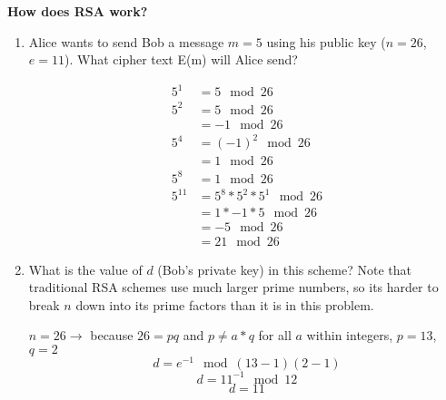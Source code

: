 \question \textbf{How does RSA work?}
\begin{enumerate}[label=\alph*.]
\item Alice wants to send Bob a message $m = 5$ using his public 
key ($n = 26$, $e = 11$). What cipher text E(m) will Alice send?

\begin{solution}[1 in]
\begin{align*}
5^1 &= 5 \mod 26 \\ 
5^2 &= 5 \mod 26 \\
&= -1 \mod 26\\
5^4 &= (-1)^2 \mod 26 \\
&= 1 \mod 26\\
5^8 &= 1 \mod 26 \\
5^{11} &= 5^8  * 5^2 * 5^1 \mod 26 \\
&= 1 * -1 * 5 \mod 26 \\
&= -5 \mod 26\\
&= 21 \mod 26
\end{align*}
\end{solution}

\item What is the value of $d$ (Bob’s private key) in this scheme? 
Note that traditional RSA schemes use much larger prime numbers, 
so its harder to break $n$ down into its prime factors than it is in 
this problem.

\begin{solution}
$n=26  \rightarrow$ because $26 = pq$ and $p\neq a*q$ for all $a$ 
within integers, $p=13$, $q=2$
\[d = e^{-1} \mod (13-1)(2-1)\]
\[d = 11^{-1} \mod 12\]
\[d = 11\]
\end{solution}
\end{enumerate}

\clearpage